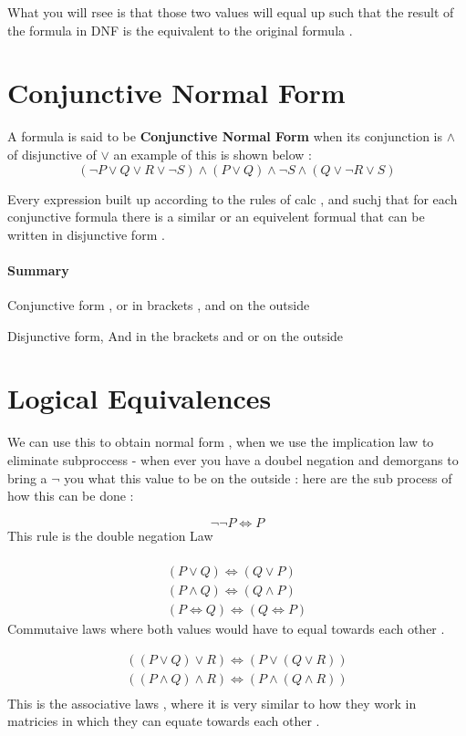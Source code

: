 \documentclass{article}
\theoremstyle{mytheoremstyle}
\theoremstyle{mytheoremstyle}
\theoremstyle{myproblemstyle}
\begin{document}
What you will rsee is that those two values will equal up such that the result of the formula in DNF is the equivalent to the original formula .

\section{Conjunctive Normal Form}
A formula is said to be \textbf{Conjunctive Normal Form} when its conjunction is $ \land $ of disjunctive of $ \lor $ an example of this is shown below :
\[(\neg P \lor Q \lor R \lor \neg S) \land (P \lor Q) \land \neg S \land (Q \lor \neg R \lor S)\]

Every expression built up according to the rules of calc , and suchj that for each conjunctive formula there is a similar or an equivelent formual that can be written in disjunctive form .

\paragraph{Summary}
\item Conjunctive form , or in brackets , and on the outside
\item Disjunctive form,  And in the brackets and or on the outside
\newpage
\section{Logical Equivalences}
We can use this to obtain normal form , when we use the implication law to eliminate subproccess - when ever you have a doubel negation and demorgans to bring a $ \neg $ you what this value to be on the outside  : here are the sub process of how this can be done :


\[\neg\neg P \iff P \]
This rule is the double negation Law \\ \\

\[ \begin{array}{c}
    (P \lor Q) \iff (Q \lor P) \\
    (P \land Q) \iff (Q \land P) \\
    (P \iff Q) \iff (Q \iff P)
\end{array}\]
Commutaive laws where both values would have to equal towards each other  .


\[\begin{array}{c}
    ((P \lor Q) \lor R) \iff (P \lor (Q \lor R))\\
    ((P \land Q) \land R) \iff (P \land(Q \land R)) \\
\end{array}\]
This is the associative laws , where it is very similar to how they work in matricies in which they can equate towards each other . \\
\end{document}
